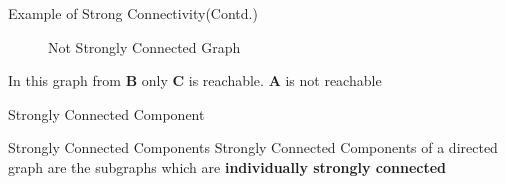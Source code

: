 \documentclass{beamer}
\begin{document}
\begin{frame}{Example of Strong Connectivity(Contd.)}

\begin{figure}
    \centering


    \caption{Not Strongly Connected Graph}
   
\end{figure}

\pause

\begin{tcolorbox}[colback=red!5!white,colframe=red!75!black]
\centering
  In this graph from \alert{\textbf{B}} only \alert{\textbf{C}} is reachable.
  \alert{\textbf{A}} is not reachable
\end{tcolorbox}


    
\end{frame}

\begin{frame}{Strongly Connected Component}

\begin{alertblock}{Strongly Connected Components}
Strongly Connected Components of a directed graph are the subgraphs which are  \alert{\textbf{individually strongly connected}}
\end{alertblock}
    
\end{frame}
\end{document}
